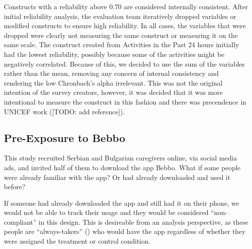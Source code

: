 \documentclass{article}
\begin{document}
Constructs with a reliability above 0.70 are considered internally consistent. After initial reliability analysis, the evaluation team iteratively dropped variables or modified constructs to ensure high reliability. In all cases, the variables that were dropped were clearly not measuring the same construct or measuring it on the same scale. The construct created from Activities in the Past 24 hours initially had the lowest reliability, possibly because some of the activities might be negatively correlated. Because of this, we decided to use the sum of the variables rather than the mean, removing any concern of internal consistency and rendering the low Chronbach's alpha irrelevant. This was not the original intention of the survey creators, however, it was decided that it was more intentional to measure the construct in this fashion and there was precendence in UNICEF work ([TODO: add reference]).













\subsection*{Pre-Exposure to Bebbo}

This study recruited Serbian and Bulgarian caregivers online, via social media ads, and invited half of them to download the app Bebbo. What if some people were already familiar with the app? Or had already downloaded and used it before?

If someone had already downloaded the app and still had it on their phone, we would not be able to track their usage and they would be considered ``non-compliant'' in this design. This is desireable from an analysis perspective, as these people are ``always-takers'' (\cite{Imbens2015}) who would have the app regardless of whether they were assigned the treatment or control condition.
\end{document}
